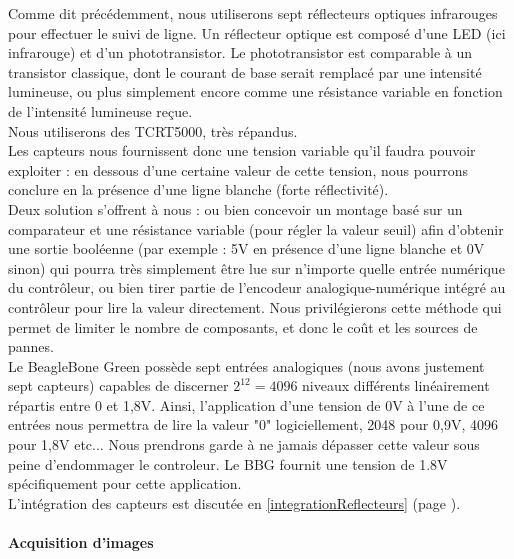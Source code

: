 			Comme dit précédemment, nous utiliserons sept réflecteurs optiques infrarouges pour effectuer le suivi de ligne.
			Un réflecteur optique est composé d'une LED  (ici infrarouge) et d'un phototransistor. Le phototransistor est comparable à un transistor classique, dont le courant de base serait remplacé par une intensité lumineuse, ou plus simplement encore comme une résistance variable en fonction de l'intensité lumineuse reçue.\\

			Nous utiliserons des TCRT5000, très répandus.\\

			Les capteurs nous fournissent donc une tension variable qu'il faudra pouvoir exploiter : en dessous d'une certaine valeur de cette tension, nous pourrons conclure en la présence d'une ligne blanche (forte réflectivité).\\

			Deux solution s'offrent à nous : ou bien concevoir un montage basé sur un comparateur et une résistance variable (pour régler la valeur seuil) afin d'obtenir une sortie booléenne (par exemple : 5V en présence d'une ligne blanche et 0V sinon) qui pourra très simplement être lue sur n'importe quelle entrée numérique du contrôleur, ou bien tirer partie de l'encodeur analogique-numérique intégré au contrôleur pour lire la valeur directement. Nous privilégierons cette méthode qui permet de limiter le nombre de composants, et donc le coût et les sources de pannes.\\

			Le BeagleBone Green possède sept entrées analogiques (nous avons justement sept capteurs) capables de discerner $2^{12} = 4096$ niveaux différents linéairement répartis entre 0 et 1,8V\cite{bib6}.
			Ainsi, l'application d'une tension de 0V à l'une de ce entrées nous permettra de lire la valeur "0" logiciellement, 2048 pour 0,9V, 4096 pour 1,8V etc... Nous prendrons garde à ne jamais dépasser cette valeur sous peine d’endommager le controleur. Le BBG fournit une tension de 1.8V spécifiquement pour cette application\cite{bib6}.\\

			L'intégration des capteurs est discutée en \ref{integrationReflecteurs} (page \pageref{integrationReflecteurs}).

		\paragraph{Acquisition d'images}

